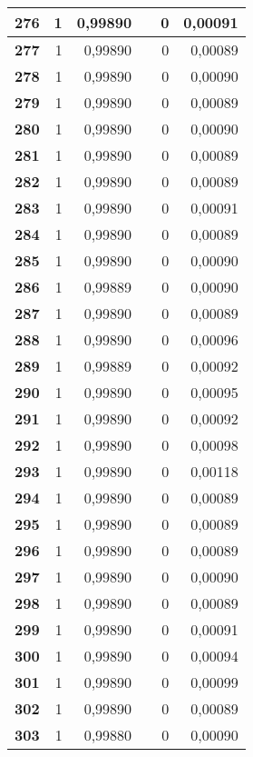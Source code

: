 {\begin{longtable}{|r|r|r|l|r|r|}
\textbf{276} & 1 & 0,99890 &  & 0 & 0,00091 \\ \hline
\textbf{277} & 1 & 0,99890 &  & 0 & 0,00089 \\ \hline
\textbf{278} & 1 & 0,99890 &  & 0 & 0,00090 \\ \hline
\textbf{279} & 1 & 0,99890 &  & 0 & 0,00089 \\ \hline
\textbf{280} & 1 & 0,99890 &  & 0 & 0,00090 \\ \hline
\textbf{281} & 1 & 0,99890 &  & 0 & 0,00089 \\ \hline
\textbf{282} & 1 & 0,99890 &  & 0 & 0,00089 \\ \hline
\textbf{283} & 1 & 0,99890 &  & 0 & 0,00091 \\ \hline
\textbf{284} & 1 & 0,99890 &  & 0 & 0,00089 \\ \hline
\textbf{285} & 1 & 0,99890 &  & 0 & 0,00090 \\ \hline
\textbf{286} & 1 & 0,99889 &  & 0 & 0,00090 \\ \hline
\textbf{287} & 1 & 0,99890 &  & 0 & 0,00089 \\ \hline
\textbf{288} & 1 & 0,99890 &  & 0 & 0,00096 \\ \hline
\textbf{289} & 1 & 0,99889 &  & 0 & 0,00092 \\ \hline
\textbf{290} & 1 & 0,99890 &  & 0 & 0,00095 \\ \hline
\textbf{291} & 1 & 0,99890 &  & 0 & 0,00092 \\ \hline
\textbf{292} & 1 & 0,99890 &  & 0 & 0,00098 \\ \hline
\textbf{293} & 1 & 0,99890 &  & 0 & 0,00118 \\ \hline
\textbf{294} & 1 & 0,99890 &  & 0 & 0,00089 \\ \hline
\textbf{295} & 1 & 0,99890 &  & 0 & 0,00089 \\ \hline
\textbf{296} & 1 & 0,99890 &  & 0 & 0,00089 \\ \hline
\textbf{297} & 1 & 0,99890 &  & 0 & 0,00090 \\ \hline
\textbf{298} & 1 & 0,99890 &  & 0 & 0,00089 \\ \hline
\textbf{299} & 1 & 0,99890 &  & 0 & 0,00091 \\ \hline
\textbf{300} & 1 & 0,99890 &  & 0 & 0,00094 \\ \hline
\textbf{301} & 1 & 0,99890 &  & 0 & 0,00099 \\ \hline
\textbf{302} & 1 & 0,99890 &  & 0 & 0,00089 \\ \hline
\textbf{303} & 1 & 0,99880 &  & 0 & 0,00090 \\ \hline

\end{longtable}}
